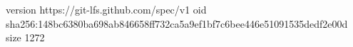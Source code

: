 version https://git-lfs.github.com/spec/v1
oid sha256:148bc6380ba698ab846658ff732ca5a9ef1bf7c6bee446e51091535dedf2e00d
size 1272
